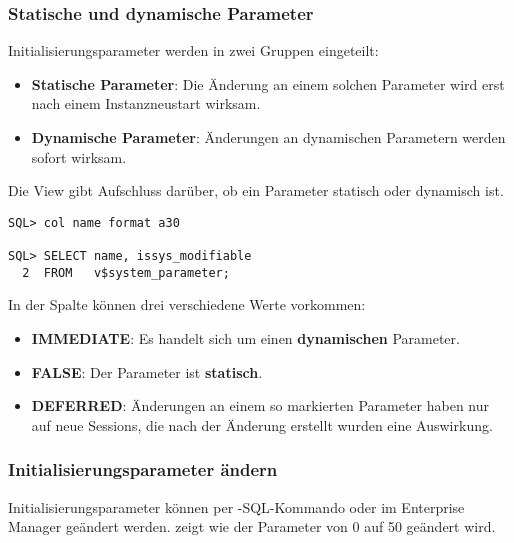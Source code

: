         \subsubsection{Statische und dynamische Parameter}
          Initialisierungsparameter werden in zwei Gruppen eingeteilt:
          \begin{itemize}
            \item \textbf{Statische Parameter}: Die Änderung an einem solchen Parameter wird erst nach einem Instanzneustart wirksam.
            \item \textbf{Dynamische Parameter}: Änderungen an dynamischen Parametern werden sofort wirksam.
          \end{itemize}
          Die View  gibt Aufschluss darüber, ob ein Parameter statisch oder dynamisch ist.
          \begin{lstlisting}[caption={Unterscheiden zwischen dynamischen und statischen Parametern},label=admin14,language=oracle_sql,alsolanguage=sqlplus]
SQL> col name format a30

SQL> SELECT name, issys_modifiable
  2  FROM   v$system_parameter;
          \end{lstlisting}
          In der Spalte  können drei verschiedene Werte vorkommen:
          \begin{itemize}
            \item \textbf{IMMEDIATE}: Es handelt sich um einen \textbf{dynamischen} Parameter.
            \item \textbf{FALSE}: Der Parameter ist \textbf{statisch}.
            \item \textbf{DEFERRED}: Änderungen an einem so markierten Parameter haben nur auf neue Sessions, die nach der Änderung erstellt wurden eine Auswirkung.
          \end{itemize}
\clearpage		  
        \subsubsection{Initialisierungsparameter ändern}
          Initialisierungsparameter können per -SQL-Kommando oder im Enterprise Manager geändert werden.  zeigt wie der Parameter  von 0 auf 50 geändert wird.
  
